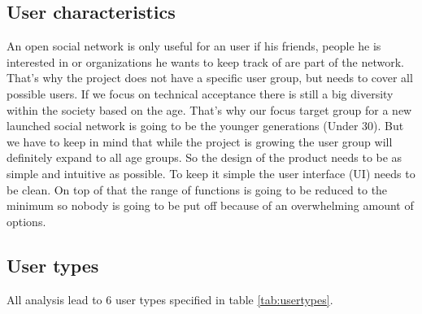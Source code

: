 \documentclass[11pt,a4paper]{report}
\begin{document}
\subsection{User characteristics}
An open social network is only useful for an user if his friends, people he is interested in or organizations he wants to keep track of are part of the network. That's why the project does not have a specific user group, but needs to cover all possible users. If we focus on technical acceptance there is still a big diversity within the society based on the age. That's why our focus target group for a new launched social network is going to be the younger generations (Under 30). But we have to keep in mind that while the project is growing the user group will definitely expand to all age groups. So the design of the product needs to be as simple and intuitive as possible. To keep it simple the user interface (UI) needs to be clean. On top of that the range of functions is going to be reduced to the minimum so nobody is going to be put off because of an overwhelming amount of options. 
\subsection{User types}
All analysis lead to 6 user types specified in table \vref{tab:usertypes}.
\end{document}
